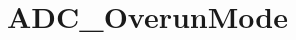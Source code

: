 \hypertarget{group___a_d_c___overun_mode}{\section{A\-D\-C\-\_\-\-Overun\-Mode}
\label{group___a_d_c___overun_mode}
}
